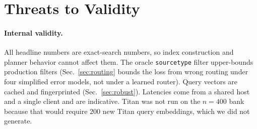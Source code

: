 \documentclass{ieeeaccess}
\makeatletter
\DeclareRobustCommand{\_}{\ifmmode\nfss@text{\textunderscore}\else\textunderscore\allowbreak\fi}
\makeatother
\begin{document}
\section{Threats to Validity}
\label{sec:threats}
\paragraph{Internal validity.}
All headline numbers are exact-search numbers, so index construction and planner behavior cannot affect them. The oracle \texttt{source\_type} filter upper-bounds production filters (Sec.~\ref{sec:routing} bounds the loss from wrong routing under four simplified error models, not under a learned router).  Query vectors are cached and fingerprinted (Sec.~\ref{sec:robust}). Latencies come from a shared host and a single client and are indicative. Titan was not run on the $n{=}400$ bank because that would require $200$ new Titan query embeddings, which we did not generate.
\end{document}
